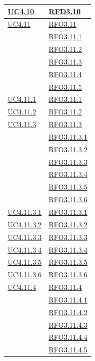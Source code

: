 \begin{itemize}
\begin{itemize}
\begin{itemize}
\begin{itemize}
\begin{longtable}{|>{\centering}m{5cm}|m{5cm}<{\centering}|}
\hyperref[UC4.10]{UC4.10} & \hyperlink{RFD3.10}{RFD3.10}\\ \hline
\hyperref[UC4.11]{UC4.11} & \hyperlink{RFO3.11}{RFO3.11}\\
& \hyperlink{RFO3.11.1}{RFO3.11.1}\\
& \hyperlink{RFO3.11.2}{RFO3.11.2}\\
& \hyperlink{RFO3.11.3}{RFO3.11.3}\\
& \hyperlink{RFO3.11.4}{RFO3.11.4}\\
& \hyperlink{RFO3.11.5}{RFO3.11.5}\\\hline

\hyperref[UC4.11.1]{UC4.11.1} & \hyperlink{RFO3.11.1}{RFO3.11.1}\\ \hline
\hyperref[UC4.11.2]{UC4.11.2} & \hyperlink{RFO3.11.2}{RFO3.11.2}\\ \hline
\hyperref[UC4.11.3]{UC4.11.3} & \hyperlink{RFO3.11.3}{RFO3.11.3}\\ & \hyperlink{RFO3.11.3.1}{RFO3.11.3.1}\\
& \hyperlink{RFO3.11.3.2}{RFO3.11.3.2}\\
& \hyperlink{RFO3.11.3.3}{RFO3.11.3.3}\\
& \hyperlink{RFO3.11.3.4}{RFO3.11.3.4}\\
& \hyperlink{RFO3.11.3.5}{RFO3.11.3.5}\\
& \hyperlink{RFO3.11.3.6}{RFO3.11.3.6}\\ \hline

\hyperref[UC4.11.3.1]{UC4.11.3.1} & \hyperlink{RFO3.11.3.1}{RFO3.11.3.1}\\ \hline
\hyperref[UC4.11.3.2]{UC4.11.3.2} & \hyperlink{RFO3.11.3.2}{RFO3.11.3.2}\\ \hline
\hyperref[UC4.11.3.3]{UC4.11.3.3} & \hyperlink{RFO3.11.3.3}{RFO3.11.3.3}\\ \hline
\hyperref[UC4.11.3.4]{UC4.11.3.4} & \hyperlink{RFO3.11.3.4}{RFO3.11.3.4}\\ \hline
\hyperref[UC4.11.3.5]{UC4.11.3.5} & \hyperlink{RFO3.11.3.5}{RFO3.11.3.5}\\ \hline
\hyperref[UC4.11.3.6]{UC4.11.3.6} & \hyperlink{RFO3.11.3.6}{RFO3.11.3.6}\\ \hline

\hyperref[UC4.11.4]{UC4.11.4} & \hyperlink{RFO3.11.4}{RFO3.11.4}\\ & \hyperlink{RFO3.11.4.1}{RFO3.11.4.1}\\
& \hyperlink{RFO3.11.4.2}{RFO3.11.4.2}\\
& \hyperlink{RFO3.11.4.3}{RFO3.11.4.3}\\
& \hyperlink{RFO3.11.4.4}{RFO3.11.4.4}\\
& \hyperlink{RFO3.11.4.5}{RFO3.11.4.5}\\ \hline


\end{longtable}
\end{itemize}
\end{itemize}
\end{itemize}
\end{itemize}
